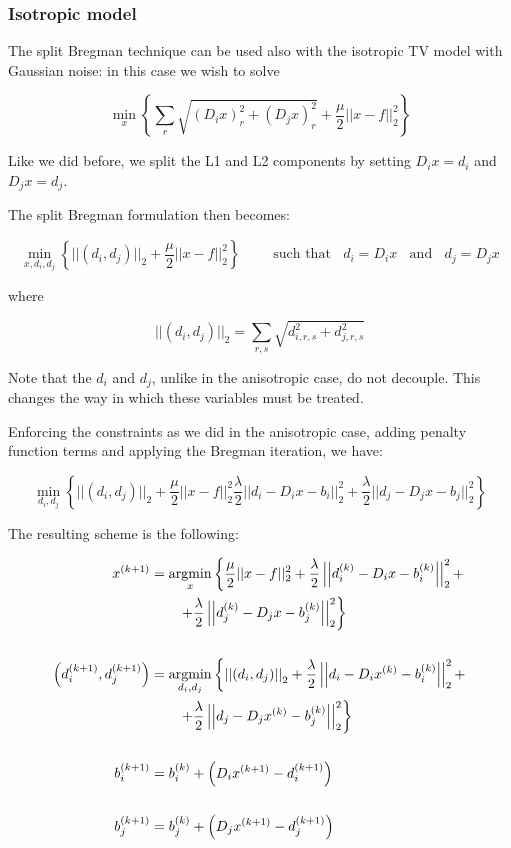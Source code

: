 \subsubsection{Isotropic model}

The split Bregman technique can be used also with the isotropic TV model with Gaussian noise: in this case we wish to solve

$$\min_x \left\{ \sum_r \sqrt{(D_i x)_r^2+(D_j x)_r^2} + \dfrac{\mu}{2}||x-f||_2^2 \right\}$$

Like we did before, we split the L1 and L2 components by setting $D_i x = d_i$ and $D_j x = d_j$.

The split Bregman formulation then becomes:

$$\min_{x,d_i,d_j} \left\{ ||(d_i,d_j)||_2 + \dfrac{\mu}{2} ||x-f||_2^2 \right\} \qquad \mbox{ such that } \; \; d_i = D_i x \; \; \mbox{ and } \; \; d_j = D_j x$$

where

$$||(d_i,d_j)||_2 = \sum_{r,s} \sqrt{d_{i,r,s}^2 + d_{j,r,s}^2}$$

Note that the $d_i$ and $d_j$, unlike in the anisotropic case, do not decouple. This changes the way in which these variables must be treated.

Enforcing the constraints as we did in the anisotropic case, adding penalty function terms and applying the Bregman iteration, we have:

$$\min_{d_i,d_j} \left\{ ||(d_i,d_j)||_2 + \dfrac{\mu}{2} ||x-f||_2^2 \dfrac{\lambda}{2} ||d_i - D_i x - b_i ||_2^2 + \dfrac{\lambda}{2} ||d_j - D_j x - b_j ||_2^2 \right\}$$

The resulting scheme is the following:

\begin{align*}
x^{(k+1)} &= \mathop{\mathrm{argmin}}\limits_x \left\{ \frac{\mu}{2}||x-f||_2^2 + \frac{\lambda}{2}\left|\left|d_i^{(k)} - D_i x - b_i^{(k)}\right|\right|_2^2 + \right. \\
&\left. \qquad+\frac{\lambda}{2}\left|\left|d_j^{(k)} - D_j x - b_j^{(k)}\right|\right|_2^2 \right\} \\
\\
\left(d_i^{(k+1)},d_j^{(k+1)}\right) &= \mathop{\mathrm{argmin}}\limits_{d_i,d_j} \left\{ \left|\left|(d_i,d_j)\right|\right|_2 + \frac{\lambda}{2} \left|\left|d_i - D_i x^{(k)} - b_i^{(k)} \right|\right|_2^2 + \right. \\
&\left. \qquad+\frac{\lambda}{2} \left|\left|d_j - D_j x^{(k)} - b_j^{(k)} \right|\right|_2^2 \right\} \\
\\
b_i^{(k+1)} &= b_i^{(k)} + \left(D_i x^{(k+1)} - d_i^{(k+1)}\right) \\
\\
b_j^{(k+1)} &= b_j^{(k)} + \left(D_j x^{(k+1)} - d_j^{(k+1)}\right)
\end{align*}

